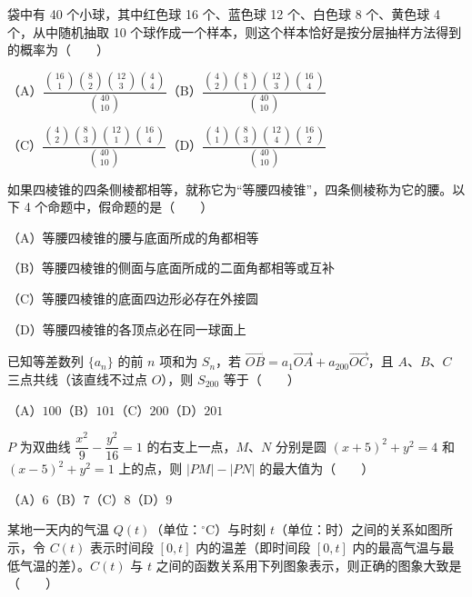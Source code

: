\begin{question}
袋中有 40 个小球，其中红色球 16 个、蓝色球 12 个、白色球 8 个、黄色球 4 个，从中随机抽取 10 个球作成一个样本，则这个样本恰好是按分层抽样方法得到的概率为\mbox{（　　）}

（A）$\dfrac{\binom{16}{1}\binom{8}{2}\binom{12}{3}\binom{4}{4}}{\binom{40}{10}}$\quad（B）$\dfrac{\binom{4}{2}\binom{8}{1}\binom{12}{3}\binom{16}{4}}{\binom{40}{10}}$

（C）$\dfrac{\binom{4}{2}\binom{8}{3}\binom{12}{1}\binom{16}{4}}{\binom{40}{10}}$\quad（D）$\dfrac{\binom{4}{1}\binom{8}{3}\binom{12}{4}\binom{16}{2}}{\binom{40}{10}}$

\end{question}
\begin{question}
如果四棱锥的四条侧棱都相等，就称它为“等腰四棱锥”，四条侧棱称为它的腰。以下 4 个命题中，假命题的是\mbox{（　　）}

（A）等腰四棱锥的腰与底面所成的角都相等

（B）等腰四棱锥的侧面与底面所成的二面角都相等或互补

（C）等腰四棱锥的底面四边形必存在外接圆

（D）等腰四棱锥的各顶点必在同一球面上

\end{question}
\begin{question}
已知等差数列 $\{a_n\}$ 的前 $n$ 项和为 $S_n$，若 $\overrightarrow{OB}=a_1\overrightarrow{OA}+a_{200}\overrightarrow{OC}$，且 $A\text{、}B\text{、}C$ 三点共线（该直线不过点 $O$），则 $S_{200}$ 等于\mbox{（　　）}

（A）$100$\quad（B）$101$\quad（C）$200$\quad（D）$201$

\end{question}
\begin{question}
$P$ 为双曲线 $\dfrac{x^2}{9}-\dfrac{y^2}{16}=1$ 的右支上一点，$M\text{、}N$ 分别是圆 $(x+5)^2+y^2=4$ 和 $(x-5)^2+y^2=1$ 上的点，则 $|PM|-|PN|$ 的最大值为\mbox{（　　）}

（A）$6$\quad（B）$7$\quad（C）$8$\quad（D）$9$

\Needspace{0.4\textheight}
\end{question}
\begin{question}
某地一天内的气温 $Q(t)$（单位：$^\circ\mathrm C$）与时刻 $t$（单位：时）之间的关系如图所示，令 $C(t)$ 表示时间段 $[0,t]$ 内的温差（即时间段 $[0,t]$ 内的最高气温与最低气温的差）。$C(t)$ 与 $t$ 之间的函数关系用下列图象表示，则正确的图象大致是\mbox{（　　）}
\nopagebreak[4]
\begin{center}\end{center}
\nopagebreak[4]
\end{question}

